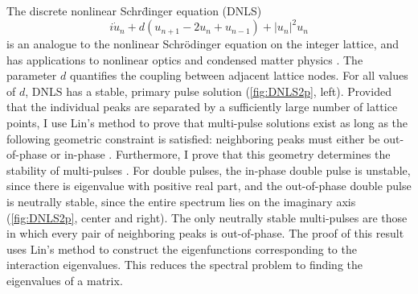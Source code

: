 The discrete nonlinear Schr\"dinger equation (DNLS)
\[
i \dot{u}_n + d(u_{n+1} - 2 u_n + u_{n-1}) + |u_n|^2 u_n
\]
is an analogue to the nonlinear Schr{\"o}dinger equation on the integer lattice,
and has applications to nonlinear optics and condensed matter physics \cite{Kevrekidis2009}. The parameter $d$ quantifies the coupling between adjacent lattice nodes. For all values of $d$, DNLS has a stable, primary pulse solution (\cref{fig:DNLS2p}, left). Provided that the individual peaks are separated by a sufficiently large number of lattice points, I use Lin's method to prove that multi-pulse solutions exist as long as the following geometric constraint is satisfied: neighboring peaks must either be out-of-phase or in-phase \cite[Theorem 4]{Parker2020}. Furthermore, I prove that this geometry determines the stability of multi-pulses \cite[Theorem 5]{Parker2020}. For double pulses, the in-phase double pulse is unstable, since there is eigenvalue with positive real part, and the out-of-phase double pulse is neutrally stable, since the entire spectrum lies on the imaginary axis (\cref{fig:DNLS2p}, center and right). The only neutrally stable multi-pulses are those in which every pair of neighboring peaks is out-of-phase. The proof of this result uses Lin's method to construct the eigenfunctions corresponding to the interaction eigenvalues. This reduces the spectral problem to finding the eigenvalues of a matrix.

